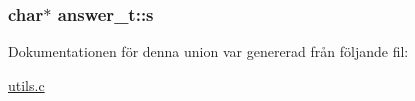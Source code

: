\subsubsection[{\texorpdfstring{s}{s}}]{\setlength{\rightskip}{0pt plus 5cm}char$\ast$ answer\+\_\+t\+::s}\hypertarget{unionanswer__t_a0de66e8519f97035ac10688155603648}{}\label{unionanswer__t_a0de66e8519f97035ac10688155603648}


Dokumentationen för denna union var genererad från följande fil\+:\begin{DoxyCompactItemize}
\item 
\hyperlink{utils_8c}{utils.\+c}\end{DoxyCompactItemize}
